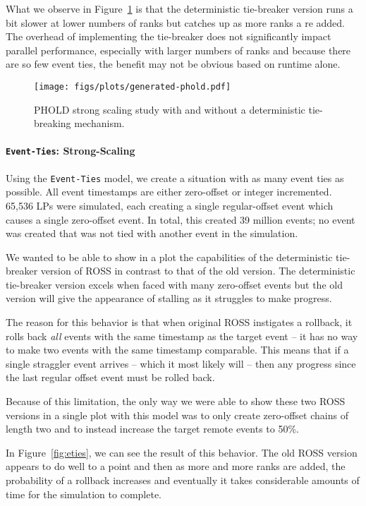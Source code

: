 \documentclass[nonacm,sigconf]{acmart}
\begin{document}
What we observe in Figure~\ref{fig:phold} is that the deterministic tie-breaker version runs a bit slower at lower numbers of ranks but catches up as more ranks a re added. The overhead of implementing the tie-breaker does not significantly impact parallel performance, especially with larger numbers of ranks and because there are so few event ties, the benefit may not be obvious based on runtime alone.

\begin{figure}[t]
  \centering
  \texttt{[image: figs/plots/generated-phold.pdf]}
  \caption{PHOLD strong scaling study with and without a deterministic tie-breaking mechanism.}\label{fig:phold}
\end{figure}


\paragraph{\texttt{Event-Ties}: Strong-Scaling}
Using the \texttt{Event-Ties} model, we create a situation with as many event ties as possible. All event timestamps are either zero-offset or integer incremented. 65,536 LPs were simulated, each creating a single regular-offset event which causes a single zero-offset event. In total, this created 39 million events; no event was created that was not tied with another event in the simulation.

We wanted to be able to show in a plot the capabilities of the deterministic tie-breaker version of ROSS in contrast to that of the old version. The deterministic tie-breaker version excels when faced with many zero-offset events but the old version will give the appearance of stalling as it struggles to make progress. 

The reason for this behavior is that when original ROSS instigates a rollback, it rolls back \emph{all} events with the same timestamp as the target event -- it has no way to make two events with the same timestamp comparable. This means that if a single straggler event arrives -- which it most likely will -- then any progress since the last regular offset event must be rolled back.

Because of this limitation, the only way we were able to show these two ROSS versions in a single plot with this model was to only create zero-offset chains of length two and to instead increase the target remote events to 50\%.

In Figure~\ref{fig:eties}, we can see the result of this behavior. The old ROSS version appears to do well to a point and then as more and more ranks are added, the probability of a rollback increases and eventually it takes considerable amounts of time for the simulation to complete.
\end{document}
